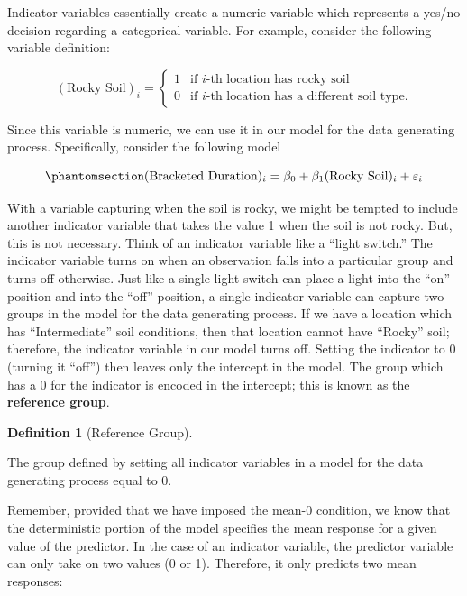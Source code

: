 \documentclass[
  letterpaper,
  DIV=11,
  numbers=noendperiod]{scrreprt}
\theoremstyle{plain}
\theoremstyle{definition}
\theoremstyle{definition}
\newtheorem{definition}{Definition}[chapter]
\theoremstyle{remark}
\begin{document}
Indicator variables essentially create a numeric variable which
represents a yes/no decision regarding a categorical variable. For
example, consider the following variable definition:

\[
(\text{Rocky Soil})_i = \begin{cases} 1 & \text{if } i\text{-th location has rocky soil} \\
0 & \text{if } i\text{-th location has a different soil type}. \end{cases}
\]

Since this variable is numeric, we can use it in our model for the data
generating process. Specifically, consider the following model

\begin{equation}\phantomsection\label{eq-regextensions-ind}{(\text{Bracketed Duration})_i = \beta_0 + \beta_1 (\text{Rocky Soil})_i + \varepsilon_i}\end{equation}

With a variable capturing when the soil is rocky, we might be tempted to
include another indicator variable that takes the value 1 when the soil
is not rocky. But, this is not necessary. Think of an indicator variable
like a ``light switch.'' The indicator variable turns on when an
observation falls into a particular group and turns off otherwise. Just
like a single light switch can place a light into the ``on'' position
and into the ``off'' position, a single indicator variable can capture
two groups in the model for the data generating process. If we have a
location which has ``Intermediate'' soil conditions, then that location
cannot have ``Rocky'' soil; therefore, the indicator variable in our
model turns off. Setting the indicator to 0 (turning it ``off'') then
leaves only the intercept in the model. The group which has a 0 for the
indicator is encoded in the intercept; this is known as the
\textbf{reference group}.

\begin{definition}[Reference
Group]\protect\hypertarget{def-reference-group}{}\label{def-reference-group}

The group defined by setting all indicator variables in a model for the
data generating process equal to 0.

\end{definition}

Remember, provided that we have imposed the mean-0 condition, we know
that the deterministic portion of the model specifies the mean response
for a given value of the predictor. In the case of an indicator
variable, the predictor variable can only take on two values (0 or 1).
Therefore, it only predicts two mean responses:
\end{document}
